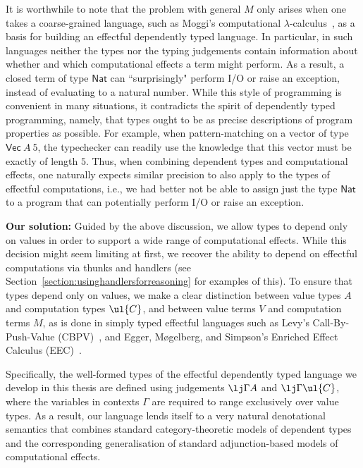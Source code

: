 It is worthwhile to note that the problem with general $M$ only arises when one takes a coarse-grained language, such as Moggi's computational $\lambda$-calculus~\cite{Moggi:ComputationalLambdaCalculus}, as a basis for building an effectful dependently typed language. In particular, in such languages neither the types nor the typing judgements contain information about whether and which computational effects a term might perform. As a result, a closed term of type $\mathsf{Nat}$ can ``surprisingly" perform I/O or raise an exception, instead of evaluating to a natural number. While this style of programming is convenient in many situations, it contradicts the spirit of dependently typed programming, namely, that types ought to be as precise descriptions of program properties  as possible. For example, when pattern-matching on a vector of type $\mathsf{Vec}~A~5$, 
the typechecker can readily use the knowledge that this vector must be exactly of length $5$. 
Thus, when combining dependent types and computational effects, one naturally expects similar precision to also apply to the types of effectful computations, i.e., we had better not be able to assign just the type $\mathsf{Nat}$ to a program that can potentially perform I/O or raise an exception. 

\vspace{0.25cm}

\noindent
\textbf{Our solution:} Guided by the above discussion, we allow types to depend only on values in order to support a wide range of computational effects. While this decision might seem limiting at first, we recover the ability to depend on effectful computations via thunks and handlers (see Section~\ref{section:usinghandlersforreasoning} for examples of this). 
To ensure that types depend only on values, we make a clear distinction between value types $A$ and computation types $\ul{C}$, and between value terms $V$ and computation terms $M$, as is done in simply typed effectful languages such as Levy's Call-By-Push-Value (CBPV)~\cite{Levy:CBPV}, 
and Egger, M{\o}gelberg, and Simpson's Enriched Effect Calculus (EEC)~\cite{Egger:EnrichedEffectCalculus}. 

Specifically, the well-formed types of the effectful dependently typed language we develop in this thesis are defined using judgements $\lj \Gamma A$ and $\lj \Gamma \ul{C}$, where the variables in contexts $\Gamma$ are required to range exclusively over value types. 
As a result,
our language lends itself to a very natural denotational semantics that combines standard category-theoretic models of dependent types 
and the corresponding generalisation of standard adjunction-based models of computational effects.


